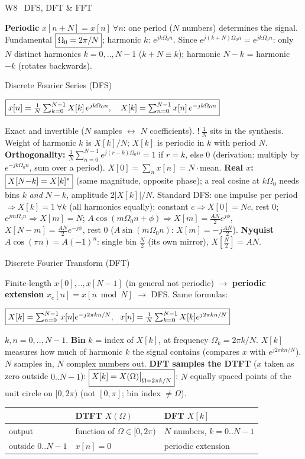\documentclass[a4paper,landscape]{article}
\newcommand{\sect}[1]{\par\vspace{1pt}\noindent\colorbox{secblue}{\parbox{\dimexpr\linewidth-2\fboxsep}{\color{white}\bfseries\fontsize{6.8}{7.6}\selectfont\strut #1}}\par\vspace{0.4pt}}
\newcommand{\sub}[1]{\par\vspace{0.6pt}\noindent\colorbox{subblue}{\parbox{\dimexpr\linewidth-2\fboxsep}{\bfseries\strut #1}}\par\vspace{0.2pt}}
\newcommand{\warn}[1]{{\color{warnred}\textbf{!}\,#1}}
\newcommand{\bx}[1]{\fbox{$\textstyle #1$}}
\newcommand{\eqc}[1]{\par\vspace{0.2pt}\centerline{$#1$}\par\vspace{0.2pt}}
\begin{document}
\begin{multicols*}{4}
\sect{W8 \ DFS, DFT \& FFT}
\textbf{Periodic} $x[n{+}N]=x[n]\ \forall n$: one period ($N$ numbers) determines the signal. Fundamental $\bx{\Omega_0=2\pi/N}$; harmonic $k$: $e^{jk\Omega_0n}$. Since $e^{j(k+N)\Omega_0n}=e^{jk\Omega_0n}$: only $N$ distinct harmonics $k=0,..,N{-}1$ ($k{+}N\equiv k$); harmonic $N{-}k$ = harmonic $-k$ (rotates backwards).
\sub{Discrete Fourier Series (DFS)}
\eqc{\bx{x[n]=\frac1N\sum_{k=0}^{N-1}X[k]\,e^{jk\Omega_0n},\quad X[k]=\sum_{n=0}^{N-1}x[n]\,e^{-jk\Omega_0n}}}
Exact and invertible ($N$ samples $\leftrightarrow$ $N$ coefficients). \warn{$\frac1N$ sits in the synthesis.} Weight of harmonic $k$ is $X[k]/N$; $X[k]$ is periodic in $k$ with period $N$.
\textbf{Orthogonality:} $\frac1N\sum_{n=0}^{N-1}e^{j(r-k)\Omega_0n}=1$ if $r{=}k$, else $0$ (derivation: multiply by $e^{-jk\Omega_0n}$, sum over a period).
$X[0]=\sum_nx[n]=N\cdot$mean. \textbf{Real $x$:} $\bx{X[N{-}k]=X[k]^*}$ (same magnitude, opposite phase); a real cosine at $k\Omega_0$ needs bins $k$ \emph{and} $N{-}k$, amplitude $2|X[k]|/N$.
Standard DFS: one impulse per period $\Rightarrow X[k]=1\ \forall k$ (all harmonics equally); constant $c\Rightarrow X[0]=Nc$, rest $0$; $e^{jm\Omega_0n}\Rightarrow X[m]=N$; $A\cos(m\Omega_0n{+}\phi)\Rightarrow X[m]=\frac{AN}2e^{j\phi}$, $X[N{-}m]=\frac{AN}2e^{-j\phi}$, rest $0$ ($A\sin(m\Omega_0n)$: $X[m]=-j\frac{AN}2$). \textbf{Nyquist} $A\cos(\pi n)=A(-1)^n$: single bin $\frac N2$ (its own mirror), $X[\frac N2]=AN$.
\sub{Discrete Fourier Transform (DFT)}
Finite-length $x[0],..,x[N{-}1]$ (in general not periodic) $\to$ \textbf{periodic extension} $x_e[n]=x[n\bmod N]$ $\to$ DFS. Same formulas:
\eqc{\bx{X[k]=\sum_{n=0}^{N-1}x[n]e^{-j2\pi kn/N},\ \ x[n]=\frac1N\sum_{k=0}^{N-1}X[k]e^{j2\pi kn/N}}}
$k,n=0,..,N{-}1$. \textbf{Bin} $k$ = index of $X[k]$, at frequency $\Omega_k=2\pi k/N$. $X[k]$ measures how much of harmonic $k$ the signal contains (compares $x$ with $e^{j2\pi kn/N}$). $N$ samples in, $N$ complex numbers out.
\textbf{DFT samples the DTFT} ($x$ taken as zero outside $0..N{-}1$): $\bx{X[k]=X(\Omega)\big|_{\Omega=2\pi k/N}}$: $N$ equally spaced points of the unit circle on $[0,2\pi)$ (not $[0,\pi]$; bin index $\ne\Omega$).\\
\begin{tabular}{@{}lll@{}}\toprule
&DTFT $X(\Omega)$&DFT $X[k]$\\\midrule
output & function of $\Omega\in[0,2\pi)$ & $N$ numbers, $k{=}0..N{-}1$\\
outside $0..N{-}1$ & $x[n]=0$ & periodic extension\\

\end{tabular}
\end{multicols*}
\end{document}
